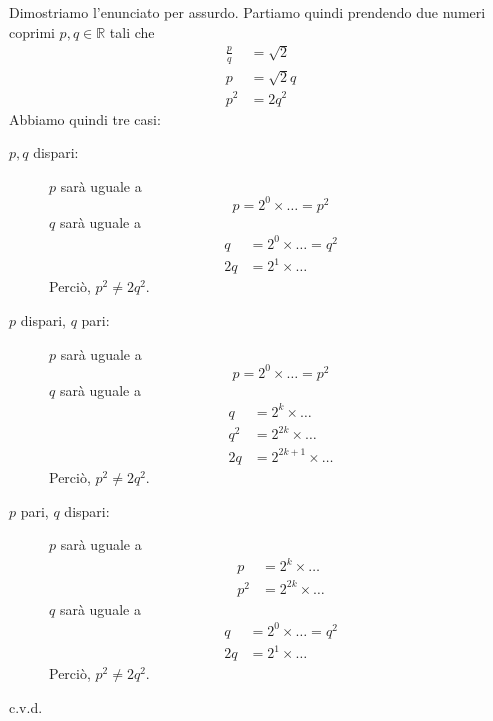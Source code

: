 \documentclass[../../dimostrazioni]{subfiles}
\begin{document}
            Dimostriamo l'enunciato per assurdo.
            Partiamo quindi prendendo due numeri coprimi \(p, q \in \mathbb{R}\) tali che
            \begin{align*}
                \frac{p}{q} &= \sqrt{2}\\
                p &= \sqrt{2} q\\
                p^2 &= 2 q^2
            \end{align*}
            Abbiamo quindi tre casi:
            \begin{description}
                \item[\(p, q\) dispari:]
                    \(p\) sarà uguale a
                    \[
                        p = 2^0 \times \dots = p^2
                    \]
                    \(q\) sarà uguale a
                    \begin{align*}
                        q &= 2^0 \times \dots = q^2\\
                        2q &= 2^1 \times \dots
                    \end{align*}
                    Perciò, \(p^2 \neq 2q^2\).
                \item[\(p\) dispari, \(q\) pari:]
                    \(p\) sarà uguale a
                    \[
                        p = 2^0 \times \dots = p^2
                    \]
                    \(q\) sarà uguale a
                    \begin{align*}
                        q &= 2^k \times \dots\\
                        q^2 &= 2^{2k} \times \dots\\
                        2q &= 2^{2k + 1} \times \dots
                    \end{align*}
                    Perciò, \(p^2 \neq 2q^2\).
                \item[\(p\) pari, \(q\) dispari:]
                    \(p\) sarà uguale a
                    \begin{align*}
                        p &= 2^k \times \dots\\
                        p^2 &= 2^{2k} \times \dots
                    \end{align*}
                    \(q\) sarà uguale a
                    \begin{align*}
                        q &= 2^0 \times \dots = q^2\\
                        2q &= 2^1 \times \dots
                    \end{align*}
                    Perciò, \(p^2 \neq 2q^2\).
            \end{description}
            c.v.d.
\end{document}
